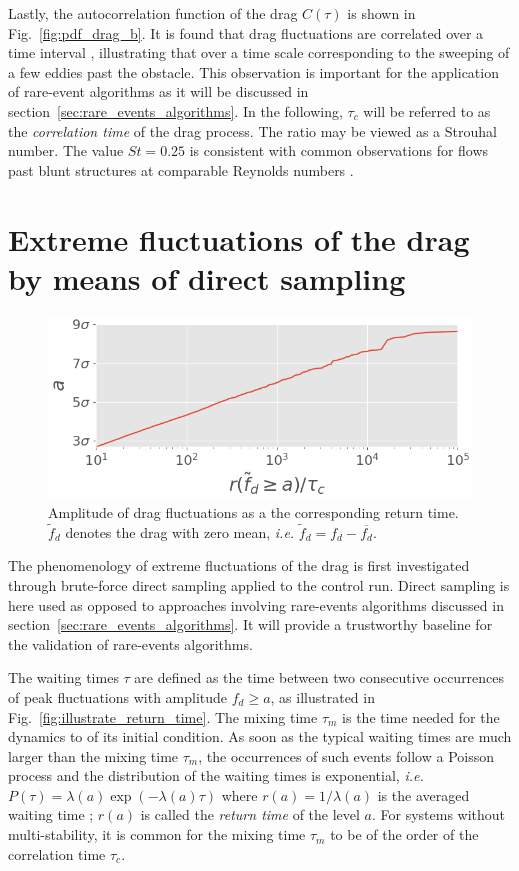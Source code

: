 \documentclass{jfm}
\newcommand{\EL}[1]{{\color{myred}{#1}}}
\begin{document}
Lastly, the autocorrelation function of the drag $C(\tau)$ is shown in Fig.~\ref{fig:pdf_drag_b}. It is found that drag fluctuations are correlated over a time interval \EL{$\tau_c \simeq 4T_0$}, illustrating that \EL{the drag loses its memory}  over a time scale corresponding to the sweeping of a few eddies past the obstacle.
%
This observation is important for the application of rare-event algorithms as it will be discussed in section~\ref{sec:rare_events_algorithms}.
%
In the following, $\tau_c$ will be referred to as the \textit{correlation time} of the drag process.
The ratio \EL{$T_0 / \tau_c$} may be viewed as a {Strouhal number}. The value $St=0.25$ is consistent with common observations for flows past blunt structures at comparable Reynolds numbers \EL{\citep{rodi1998}}.

\section{Extreme fluctuations of the drag by means of direct sampling}
\label{sec:direct_sampling}



\begin{figure}
	\centering
	\includegraphics[width=.6\linewidth]{return_time/return_time.png}
	\caption{Amplitude of drag fluctuations as a \EL{function of} the corresponding return time. $\tilde{f}_d$ denotes the drag with zero mean, \textit{i.e.} $\tilde{f}_d = f_d - \overline{f_d}$.
	}
	\label{fig:return_time_instant}
\end{figure}

%
The phenomenology of extreme fluctuations of the drag is first investigated through brute-force direct sampling applied to the control run.
Direct sampling is here used as opposed to approaches involving rare-events algorithms discussed in section~\ref{sec:rare_events_algorithms}.
It will provide a trustworthy baseline for the validation of rare-events algorithms. 

The waiting times $\tau$ are defined as the time between two consecutive occurrences of peak fluctuations with amplitude $f_d \geq a$, as illustrated in Fig.~\ref{fig:illustrate_return_time}.
The mixing time $\tau_m$ is the time needed for the dynamics to \EL{lose the memory} of its initial condition.
As soon as the typical waiting times are much larger than the mixing time $\tau_m$, the occurrences of such events follow a Poisson process and the distribution of the waiting times is exponential, \emph{i.e.} $P(\tau)=\lambda(a)\exp(-\lambda(a)\tau)$ where $r(a)=1/\lambda(a)$ is the averaged waiting time \citep{lestang_computing_2018}; $r(a)$ is called the {\it return time} of the level $a$.
For systems without multi-stability, it is common for the mixing time $\tau_m$ to be of the order of the correlation time $\tau_c$.
\end{document}
